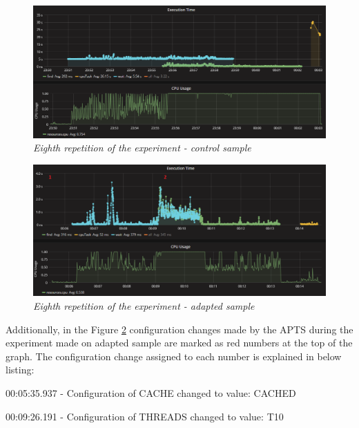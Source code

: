 \documentclass[12pt,a4paper]{article}
\let\tmpone\enumerate
\let\tmptwo\endenumerate
\renewenvironment{enumerate}{\tmpone\addtolength{\itemsep}{-0.4\baselineskip}}{\tmptwo}
\begin{document}
\begin{figure}[!htb]
\centering
\includegraphics[width=1\textwidth]{8-ctrl}
\caption{\textit{Eighth repetition of the experiment - control sample}} \label{figure:random:screen:control:8}
\end{figure}

\begin{figure}[!htb]
\centering
\includegraphics[width=1\textwidth]{8-adap}
\caption{\textit{Eighth repetition of the experiment - adapted sample}} \label{figure:random:screen:adapted:8}
\end{figure}

Additionally, in the Figure \ref{figure:random:screen:adapted:8} configuration changes made by the APTS during the experiment made on adapted sample are marked as red numbers at the top of the graph. The configuration change assigned to each number is explained in below listing: 

\begin{enumerate}
\item 00:05:35.937 - Configuration of CACHE changed to value: CACHED
\item 00:09:26.191 - Configuration of THREADS changed to value: T10
\end{enumerate}
\end{document}
